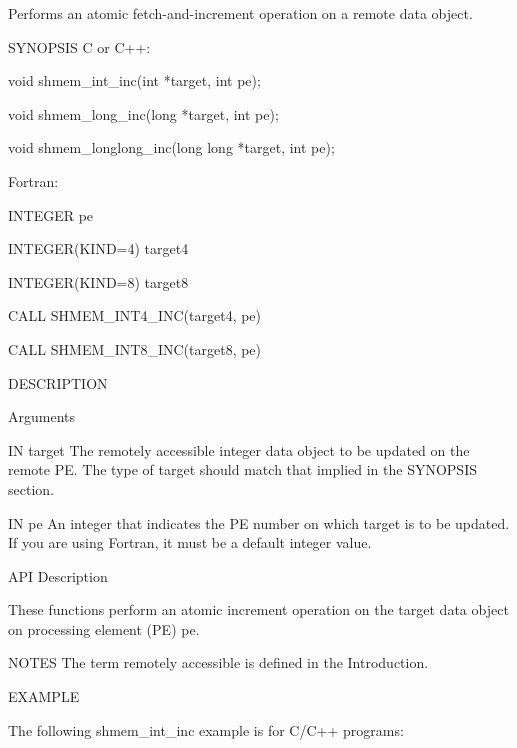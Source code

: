        Performs an atomic fetch-and-increment  operation
       on a remote data object.

SYNOPSIS
       C or C++:

	  void shmem_int_inc(int *target, int pe);

	  void shmem_long_inc(long *target, int pe);

	  void shmem_longlong_inc(long long *target, int pe);

       Fortran:

	  INTEGER pe

	  INTEGER(KIND=4) target4

	  INTEGER(KIND=8) target8

	  CALL SHMEM_INT4_INC(target4, pe)

	  CALL SHMEM_INT8_INC(target8, pe)

DESCRIPTION

Arguments

	IN       target	 The remotely accessible integer data object to be updated  on
		 the  remote PE.  The type of target should match that implied
		 in the SYNOPSIS section.

       IN	pe	 An integer that indicates the PE number on which target is to
		 be  updated.  If  you are using Fortran, it must be a default
		 integer value.

API Description

       These  functions	 perform  an  atomic increment operation on the target
       data object on processing element (PE) pe.


NOTES
       The term remotely accessible is defined in the Introduction.

EXAMPLE

	The following shmem_int_inc example is for C/C++ programs:

       
